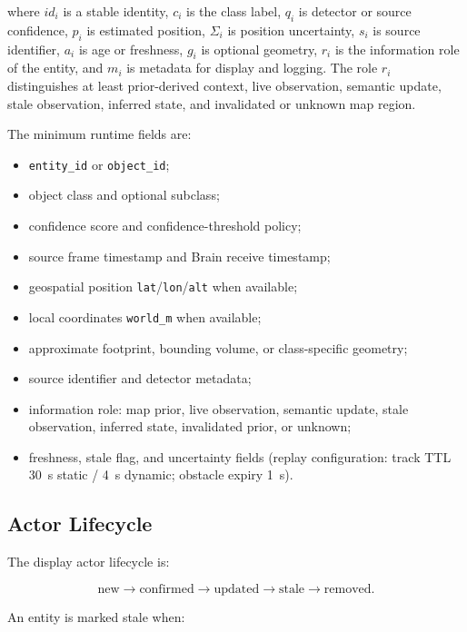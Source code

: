 \documentclass[fleqn]{VRIH2025}
\newcommand{\code}[1]{\texttt{#1}}
\begin{document}
where \(id_i\) is a stable identity, \(c_i\) is the class label, \(q_i\) is detector or source confidence, \(p_i\) is estimated position, \(\Sigma_i\) is position uncertainty, \(s_i\) is source identifier, \(a_i\) is age or freshness, \(g_i\) is optional geometry, \(r_i\) is the information role of the entity, and \(m_i\) is metadata for display and logging. The role \(r_i\) distinguishes at least prior-derived context, live observation, semantic update, stale observation, inferred state, and invalidated or unknown map region.

The minimum runtime fields are:

\begin{itemize}
    \item \code{entity\_id} or \code{object\_id};
    \item object class and optional subclass;
    \item confidence score and confidence-threshold policy;
    \item source frame timestamp and Brain receive timestamp;
    \item geospatial position \code{lat}/\code{lon}/\code{alt} when available;
    \item local coordinates \code{world\_m} when available;
    \item approximate footprint, bounding volume, or class-specific geometry;
    \item source identifier and detector metadata;
    \item information role: map prior, live observation, semantic update, stale observation, inferred state, invalidated prior, or unknown;
    \item freshness, stale flag, and uncertainty fields (replay configuration: track TTL 30~s static / 4~s dynamic; obstacle expiry 1~s).
\end{itemize}

\subsection{Actor Lifecycle}

The display actor lifecycle is:

\begin{equation}
\text{new} \rightarrow \text{confirmed} \rightarrow \text{updated} \rightarrow \text{stale} \rightarrow \text{removed}.
\label{eq:lifecycle}
\end{equation}

An entity is marked stale when:
\end{document}
